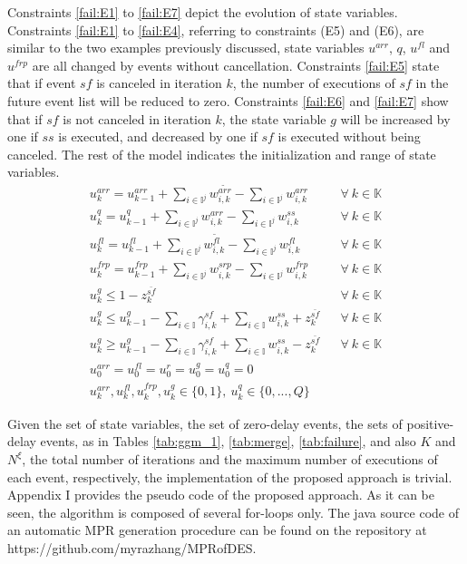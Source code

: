 \documentclass[suppldata]{interact}
\theoremstyle{plain}
\theoremstyle{definition}
\theoremstyle{remark}
\begin{document}
Constraints \eqref{fail:E1} to \eqref{fail:E7} depict the evolution of state variables. Constraints \eqref{fail:E1} to \eqref{fail:E4}, referring to constraints (E5) and (E6), are similar to the two examples previously discussed, state variables $u^{arr}$, $q$, $u^{fl}$ and $u^{frp}$ are all changed by events without cancellation. Constraints \eqref{fail:E5} state that if event ${sf}$ is canceled in iteration $k$, the number of executions of ${sf}$ in the future event list will be reduced to zero. Constraints \eqref{fail:E6} and \eqref{fail:E7} show that if ${sf}$ is not canceled in iteration $k$, the state variable $g$ will be increased by one if ${ss}$ is executed, and decreased by one if ${sf}$ is executed without being canceled. The rest of the model indicates the initialization and range of state variables.
\begin{eqnarray}
	u^{arr}_k=u^{arr}_{k-1}+ \sum_{i\in\mathbb{I}^j}w^{\tilde{arr}}_{i,k}-\sum_{i\in\mathbb{I}^j}w^{arr}_{i,k}&&\forall\ k\in \mathbb{K}\label{fail:E1}\\
	u^{q}_k=u^{q}_{k-1}+ \sum_{i\in\mathbb{I}^j}w^{arr}_{i,k}-\sum_{i\in\mathbb{I}^j}w^{ss}_{i,k}&&\forall\ k\in \mathbb{K}\label{fail:E2}\\
	u^{fl}_k=u^{fl}_{k-1}+ \sum_{i\in\mathbb{I}^j}w^{\tilde{fl}}_{i,k}-\sum_{i\in\mathbb{I}^j}w^{fl}_{i,k}&&\forall\ k\in \mathbb{K}\label{fail:E3}\\
	u^{frp}_k=u^{frp}_{k-1}+ \sum_{i\in\mathbb{I}^j}w^{srp}_{i,k}-\sum_{i\in\mathbb{I}^j}w^{frp}_{i,k}&&\forall\ k\in \mathbb{K}\label{fail:E4}\\
	u^{g}_k \le 1-z^{\bar{sf}}_{k}&&\forall\ k\in \mathbb{K}\label{fail:E5}\\
	u^{g}_k\le u^{g}_{k-1}- \sum_{i\in \mathbb{I}} \gamma^{sf}_{i,k} +\sum_{i\in \mathbb{I}} w^{ss}_{i,k} + z^{\bar{sf}}_{k}&&\forall\ k\in \mathbb{K}\label{fail:E6}\\
	u^{g}_k\ge u^{g}_{k-1}-  \sum_{i\in \mathbb{I}} \gamma^{sf}_{i,k} +\sum_{i\in \mathbb{I}} w^{ss}_{i,k}  - z^{\bar{sf}}_{k}&&\forall\ k\in \mathbb{K}\label{fail:E7}\\
	u^{arr}_0=u^{fl}_0=u^{r}_0=u^{g}_0=u^{q}_0=0\nonumber\\
	u^{arr}_k,u^{fl}_k,u^{frp}_k,u^{g}_k\in\{0,1\},\ u^{q}_k\in\{0,...,Q\}\nonumber
\end{eqnarray}

\bigskip
Given the set of state variables, the set of zero-delay events, the sets of positive-delay events, as in Tables \ref{tab:ggm_1}, \ref{tab:merge}, \ref{tab:failure}, and also $K$ and $N^{\xi}$, the total number of  iterations and the maximum number of executions of each event, respectively, the implementation of the proposed approach is trivial. Appendix I provides the pseudo code of the proposed approach. As it can be seen, the algorithm is composed of several for-loops only. The java source code of an automatic MPR generation procedure can be found on the repository at https://github.com/myrazhang/MPRofDES.
\end{document}
